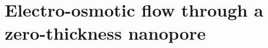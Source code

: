 \chapter{Electro-osmotic flow through a zero-thickness nanopore}
\label{chpt:zero_thickness}
\providecommand\bcdot{\boldsymbol{\cdot}}
\newcommand\biS{\boldsymbol{S}}
\newcommand\etb{\boldsymbol{\eta}}

\newcommand\Real{\mbox{Re}} %
\newcommand\Imag{\mbox{Im}} %
\newcommand\Rey{\mbox{\textit{Re}}}  %
\newcommand\Pran{\mbox{\textit{Pr}}} %
\newcommand\Pen{\mbox{\textit{Pe}}}  %
\newcommand\Ai{\mbox{Ai}}            %
\newcommand\Bi{\mbox{Bi}}            %

\newcommand\ssC{\mathsf{C}}    %
\newcommand\sfsP{\mathsfi{P}}  %
\newcommand\slsQ{\mathsfbi{Q}} %

\newcommand\hatp{\skew3\hat{p}}      %
\newcommand\hatR{\skew3\hat{R}}      %
\newcommand\hatRR{\skew3\hat{\hatR}} %
\newcommand\doubletildesigma{\skew2\tilde{\skew2\tilde{\Sigma}}}%

\newsavebox{\astrutbox}
\sbox{\astrutbox}{\rule[-5pt]{0pt}{20pt}}
\newcommand{\astrut}{\usebox{\astrutbox}}

\newcommand\GaPQ{\ensuremath{G_a(P,Q)}}
\newcommand\GsPQ{\ensuremath{G_s(P,Q)}}
\newcommand\p{\ensuremath{\partial}}
\newcommand\tti{\ensuremath{\rightarrow\infty}}
\newcommand\kgd{\ensuremath{k\gamma d}}
\newcommand\shalf{\ensuremath{{\scriptstyle\frac{1}{2}}}}
\newcommand\sh{\ensuremath{^{\shalf}}}
\newcommand\smh{\ensuremath{^{-\shalf}}}
\newcommand\squart{\ensuremath{{\textstyle\frac{1}{4}}}}
\newcommand\thalf{\ensuremath{{\textstyle\frac{1}{2}}}}
\newcommand\Gat{\ensuremath{\widetilde{G_a}}}
\newcommand\ttz{\ensuremath{\rightarrow 0}}
\newcommand\ndq{\ensuremath{\frac{\mbox{$\partial$}}{\mbox{$\partial$}n_q}}}
\newcommand\sumjm{\ensuremath{\sum_{j=1}^{M}}}
\newcommand\pvi{\ensuremath{\int_0^{\infty}%
\mskip \ifCUPmtlplainloaded -30mu\else -33mu\fi -\quad}}

\newcommand\etal{\mbox{\textit{et al.}}}
\newcommand\etc{etc.\ }
\newcommand\eg{e.g.\ }


